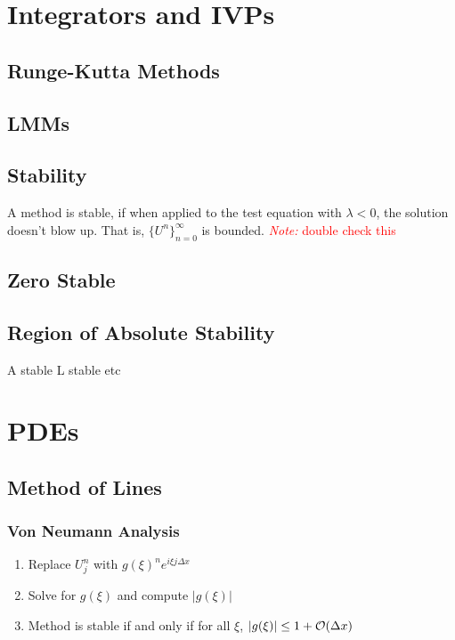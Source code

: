 \documentclass[12pt]{article}
\newcommand{\note}[1]{\textcolor{red}{\textit{Note:} #1}}
\begin{document}
\pagebreak
\section{Integrators and IVPs}

\subsection{Runge-Kutta Methods}


\subsection{LMMs}


\subsection{Stability}
A method is stable, if when applied to the test equation with \( \lambda < 0 \), the solution doesn't blow up. That is, \( \{ U^n \}_{n=0}^{\infty} \) is bounded.
\note{double check this}

\subsection{Zero Stable}

\subsection{Region of Absolute Stability}

A stable L stable etc

\section{PDEs}
\subsection{Method of Lines}

\subsubsection{Von Neumann Analysis}

\begin{enumerate}[nolistsep]
    \item Replace \( U_j^n \) with \( g(\xi)^n e^{i\xi j \Delta x} \)
    \item Solve for \( g(\xi) \) and compute \( |g(\xi)| \)
    \item Method is stable if and only if for all \( \xi \), \( |g(\xi)| \leq 1+\mathcal{O}(\Delta x) \)
\end{enumerate}
\end{document}
